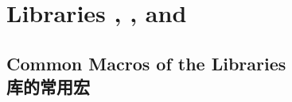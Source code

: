 \section{Libraries
  ,
  , and
  }\label{sec:listings}%
%



\subsection{Common Macros of the Libraries\\库的常用宏}









